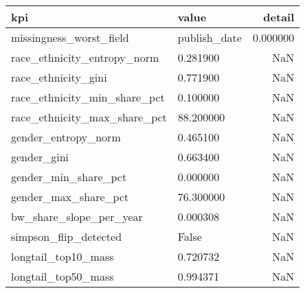 \begin{tabular}{llr}
\toprule
kpi & value & detail \\
\midrule
missingness_worst_field & publish_date & 0.000000 \\
race_ethnicity_entropy_norm & 0.281900 & NaN \\
race_ethnicity_gini & 0.771900 & NaN \\
race_ethnicity_min_share_pct & 0.100000 & NaN \\
race_ethnicity_max_share_pct & 88.200000 & NaN \\
gender_entropy_norm & 0.465100 & NaN \\
gender_gini & 0.663400 & NaN \\
gender_min_share_pct & 0.000000 & NaN \\
gender_max_share_pct & 76.300000 & NaN \\
bw_share_slope_per_year & 0.000308 & NaN \\
simpson_flip_detected & False & NaN \\
longtail_top10_mass & 0.720732 & NaN \\
longtail_top50_mass & 0.994371 & NaN \\
\bottomrule
\end{tabular}
